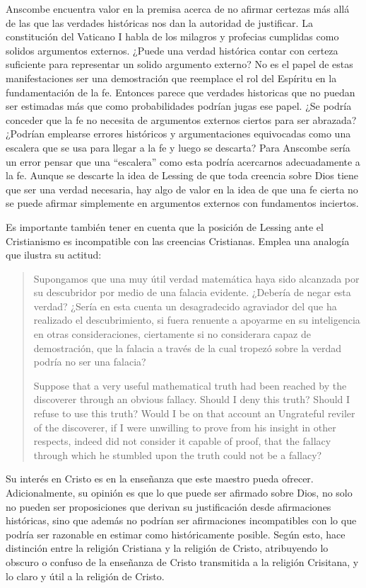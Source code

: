 Anscombe encuentra valor en la premisa acerca de no afirmar certezas más allá de
las que las verdades históricas nos dan la autoridad de justificar. La
constitución del Vaticano I habla de los milagros y profecias cumplidas como
solidos argumentos externos. ¿Puede una verdad histórica contar con certeza
suficiente para representar un solido argumento externo? No es el papel de estas
manifestaciones ser una demostración que reemplace el rol del Espíritu en la
fundamentación de la fe. Entonces parece que verdades historicas que no puedan
ser estimadas más que como probabilidades podrían jugas ese papel. ¿Se podría
conceder que la fe no necesita de argumentos externos ciertos para ser abrazada?
¿Podrían emplearse errores históricos y argumentaciones equivocadas como una
escalera que se usa para llegar a la fe y luego se descarta? Para Anscombe sería
un error pensar que una \enquote{escalera} como esta podría acercarnos
adecuadamente a la fe. Aunque se descarte la idea de Lessing de que toda
creencia sobre Dios tiene que ser una verdad necesaria, hay algo de valor en la
idea de que una fe cierta no se puede afirmar simplemente en argumentos externos
con fundamentos inciertos.

Es importante también tener en cuenta que la posición de Lessing ante el
Cristianismo es incompatible con las creencias Cristianas. Emplea una analogía
que ilustra su actitud: \blockquote[Suppose that a very useful mathematical
truth had been reached by the discoverer through an obvious fallacy. \textelp{}
Should I deny this truth? Should I refuse to use this truth? Would I be on that
account an Ungrateful reviler of the discoverer, if I were unwilling to prove
from his insight in other respects, indeed did not consider it capable of proof,
that the fallacy through which he stumbled upon the truth could not be a
fallacy?]{Supongamos que una muy útil verdad matemática haya sido alcanzada por
  su descubridor por medio de una falacia evidente. \textelp{} ¿Debería de negar
  esta verdad? ¿Sería en esta cuenta un desagradecido agraviador del que ha
  realizado el descubrimiento, si fuera renuente a apoyarme en su inteligencia
  en otras consideraciones, ciertamente si no considerara capaz de demostración,
  que la falacia a través de la cual tropezó sobre la verdad podría no ser una
  falacia?} Su interés en Cristo es en la enseñanza que este maestro pueda
ofrecer. Adicionalmente, su opinión es que lo que puede ser afirmado sobre Dios,
no solo no pueden ser proposiciones que derivan su justificación desde
afirmaciones históricas, sino que además no podrían ser afirmaciones
incompatibles con lo que podría ser razonable en estimar como históricamente
posible. Según esto, hace distinción entre la religión Cristiana y la religión
de Cristo, atribuyendo lo obscuro o confuso de la enseñanza de Cristo
transmitida a la religión Crisitana, y lo claro y útil a la religión de Cristo.

